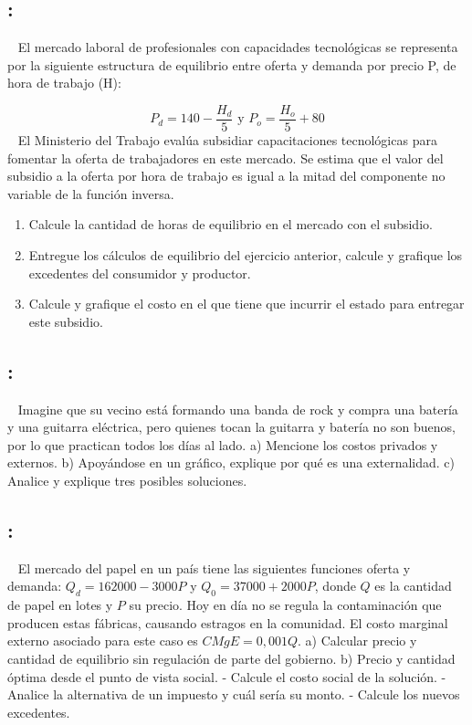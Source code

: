 \documentclass[
  letterpaper,
  DIV=11,
  numbers=noendperiod]{scrreport}
\begin{document}
\hypertarget{section-57}{%
\subsection{:}\label{section-57}}

~ El mercado laboral de profesionales con capacidades tecnológicas se
representa por la siguiente estructura de equilibrio entre oferta y
demanda por precio P, de hora de trabajo (H):

\[P_d = 140 - \frac{H_d}{5} \text{ y } P_o = \frac{H_o}{5}+80\] ~ El
Ministerio del Trabajo evalúa subsidiar capacitaciones tecnológicas para
fomentar la oferta de trabajadores en este mercado. Se estima que el
valor del subsidio a la oferta por hora de trabajo es igual a la mitad
del componente no variable de la función inversa.

\begin{enumerate}
\def\labelenumi{\alph{enumi})}
\item
  Calcule la cantidad de horas de equilibrio en el mercado con el
  subsidio.
\item
  Entregue los cálculos de equilibrio del ejercicio anterior, calcule y
  grafique los excedentes del consumidor y productor.
\item
  Calcule y grafique el costo en el que tiene que incurrir el estado
  para entregar este subsidio.
\end{enumerate}

\hypertarget{section-58}{%
\subsection{:}\label{section-58}}

~ Imagine que su vecino está formando una banda de rock y compra una
batería y una guitarra eléctrica, pero quienes tocan la guitarra y
batería no son buenos, por lo que practican todos los días al lado. a)
Mencione los costos privados y externos. b) Apoyándose en un gráfico,
explique por qué es una externalidad. c) Analice y explique tres
posibles soluciones.

\hypertarget{section-59}{%
\subsection{:}\label{section-59}}

~ El mercado del papel en un país tiene las siguientes funciones oferta
y demanda: \(Q_d=162000-3000P\) y \(Q_0=37000+2000P\), donde \(Q\) es la
cantidad de papel en lotes y \(P\) su precio. Hoy en día no se regula la
contaminación que producen estas fábricas, causando estragos en la
comunidad. El costo marginal externo asociado para este caso es
\(CMgE=0,001Q\). a) Calcular precio y cantidad de equilibrio sin
regulación de parte del gobierno. b) Precio y cantidad óptima desde el
punto de vista social. - Calcule el costo social de la solución. -
Analice la alternativa de un impuesto y cuál sería su monto. - Calcule
los nuevos excedentes.
\end{document}

